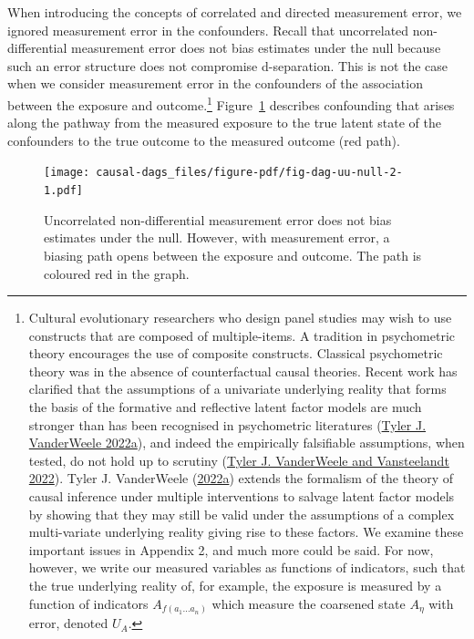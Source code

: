 \documentclass[
  singlecolumn]{report}
\begin{document}
When introducing the concepts of correlated and directed measurement
error, we ignored measurement error in the confounders. Recall that
uncorrelated non-differential measurement error does not bias estimates
under the null because such an error structure does not compromise
d-separation. This is not the case when we consider measurement error in
the confounders of the association between the exposure and
outcome.\footnote{Cultural evolutionary researchers who design panel
  studies may wish to use constructs that are composed of
  multiple-items. A tradition in psychometric theory encourages the use
  of composite constructs. Classical psychometric theory was in the
  absence of counterfactual causal theories. Recent work has clarified
  that the assumptions of a univariate underlying reality that forms the
  basis of the formative and reflective latent factor models are much
  stronger than has been recognised in psychometric literatures
  (\protect\hyperlink{ref-vanderweele2022a}{Tyler J. VanderWeele
  2022a}), and indeed the empirically falsifiable assumptions, when
  tested, do not hold up to scrutiny
  (\protect\hyperlink{ref-vanderweele2022b}{Tyler J. VanderWeele and
  Vansteelandt 2022}). Tyler J. VanderWeele
  (\protect\hyperlink{ref-vanderweele2022a}{2022a}) extends the
  formalism of the theory of causal inference under multiple
  interventions to salvage latent factor models by showing that they may
  still be valid under the assumptions of a complex multi-variate
  underlying reality giving rise to these factors. We examine these
  important issues in Appendix 2, and much more could be said. For now,
  however, we write our measured variables as functions of indicators,
  such that the true underlying reality of, for example, the exposure is
  measured by a function of indicators \(A_{f(a_1\dots a_n)}^{}\) which
  measure the coarsened state \(A_\eta\) with error, denoted \(U_A\).}
Figure~\ref{fig-dag-uu-null-2} describes confounding that arises along
the pathway from the measured exposure to the true latent state of the
confounders to the true outcome to the measured outcome (red path).

\begin{figure}

{\centering \texttt{[image: causal-dags\_files/figure-pdf/fig-dag-uu-null-2-1.pdf]}

}

\caption{\label{fig-dag-uu-null-2}Uncorrelated non-differential
measurement error does not bias estimates under the null. However, with
measurement error, a biasing path opens between the exposure and
outcome. The path is coloured red in the graph.}

\end{figure}
\end{document}
